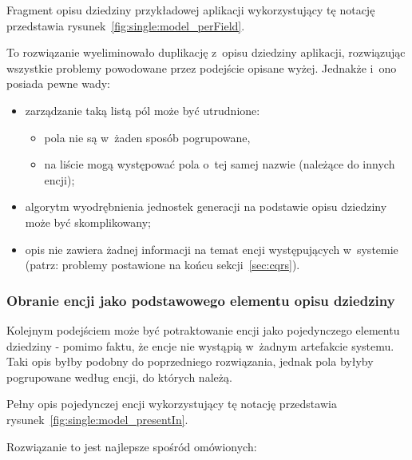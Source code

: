 Fragment opisu dziedziny przykładowej aplikacji wykorzystujący tę notację przedstawia rysunek~\ref{fig:single:model_perField}.



To rozwiązanie wyeliminowało duplikację z~opisu dziedziny aplikacji, rozwiązując wszystkie problemy powodowane przez podejście opisane wyżej.
Jednakże i~ono posiada pewne wady:

\begin{itemize}
 \item zarządzanie taką listą pól może być utrudnione:
  \begin{itemize}
   \item pola nie są w~żaden sposób pogrupowane,
   \item na liście mogą występować pola o~tej samej nazwie (należące do innych encji);
  \end{itemize}
 \item algorytm wyodrębnienia jednostek generacji na podstawie opisu dziedziny może być skomplikowany;
 \item opis nie zawiera żadnej informacji na temat encji występujących w~systemie (patrz: problemy postawione na końcu sekcji~\ref{sec:cqrs}).
\end{itemize}

\subsubsection{Obranie encji jako podstawowego elementu opisu dziedziny}

Kolejnym podejściem może być potraktowanie encji jako pojedynczego elementu dziedziny - pomimo faktu, że encje nie wystąpią w~żadnym artefakcie systemu.
Taki opis byłby podobny do poprzedniego rozwiązania, jednak pola byłyby pogrupowane według encji, do których należą.

Pełny opis pojedynczej encji wykorzystujący tę notację przedstawia rysunek~\ref{fig:single:model_presentIn}.



Rozwiązanie to jest najlepsze spośród omówionych:

